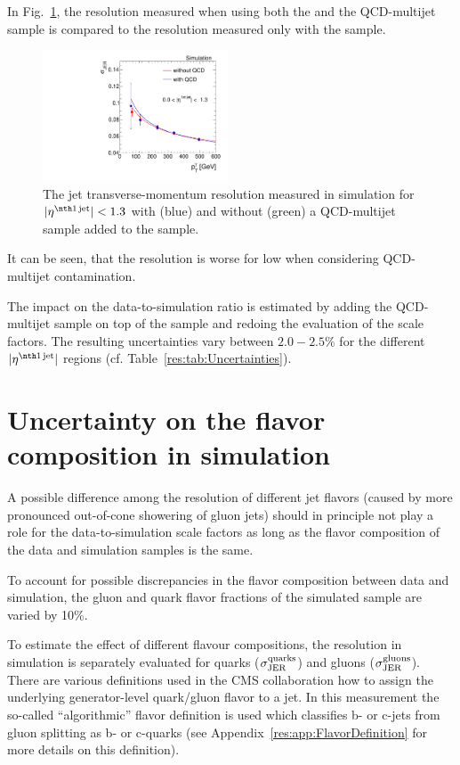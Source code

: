In Fig.~\ref{res:fig:QCDuncertainty}, the resolution measured when using both the \GAMJET and the QCD-multijet sample is compared to the resolution measured only with the \GAMJET sample.
\begin{figure}[t]
  \centering
      \includegraphics[width=0.49\textwidth]{figures/resolution/systematicUncertainties/Resolution_for_1_eta_bin_QCDUncertainty_RMS99.pdf}
  \caption{The jet transverse-momentum resolution measured in simulation for $|\etafirstjet| < 1.3$ with (blue) and without (green) a QCD-multijet sample added to the \GAMJET sample.}  
  \label{res:fig:QCDuncertainty}
\end{figure}
It can be seen, that the resolution is worse for low \ptgamma when considering QCD-multijet contamination.

The impact on the data-to-simulation ratio is estimated by adding the QCD-multijet sample on top of the \GAMJET sample and redoing the evaluation of the scale factors.
The resulting uncertainties vary between $2.0-2.5\%$ for the different $|\etafirstjet|$ regions (cf. Table~\ref{res:tab:Uncertainties}).

\section*{Uncertainty on the flavor composition in simulation}
A possible difference among the resolution of different jet flavors (caused by \eg more pronounced out-of-cone showering of gluon jets) 
should in principle not play a role for the data-to-simulation scale factors \rhores as long as the flavor composition of the data and simulation samples is the same. 

To account for possible discrepancies in the flavor composition between data and simulation, the gluon and quark flavor fractions of the simulated sample are varied by 10\%.



To estimate the effect of different flavour compositions, the resolution in simulation is separately evaluated for quarks ($\sigma_\mathrm{JER}^\text{quarks}$) and gluons ($\sigma_\mathrm{JER}^\text{gluons}$). 
There are various definitions used in the CMS collaboration how to assign the underlying generator-level quark/gluon flavor to a jet.
In this measurement the so-called ``algorithmic'' flavor definition is used which classifies b- or c-jets from gluon splitting as b- or c-quarks (see Appendix~\ref{res:app:FlavorDefinition} for more details on this definition).

